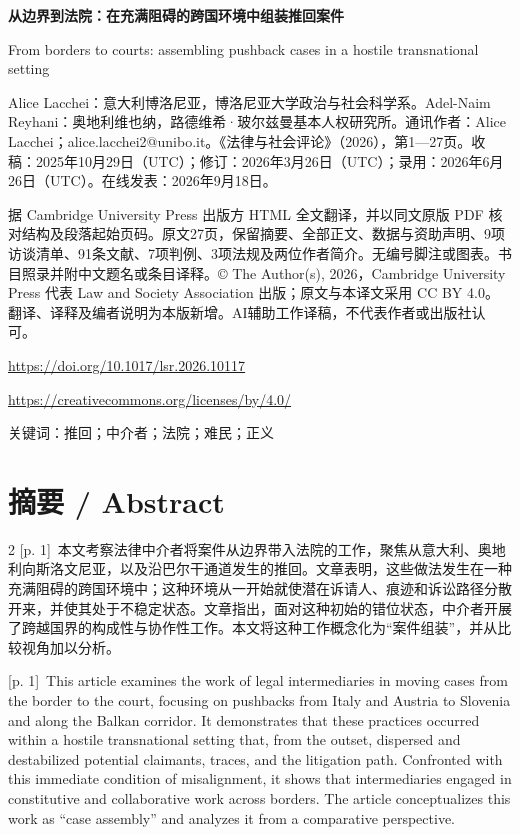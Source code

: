 \documentclass[10pt,a4paper]{article}
\begin{document}
{\Large\bfseries 从边界到法院：在充满阻碍的跨国环境中组装推回案件\par}\medskip
From borders to courts: assembling pushback cases in a hostile transnational setting\par
Alice Lacchei：意大利博洛尼亚，博洛尼亚大学政治与社会科学系。Adel-Naim Reyhani：奥地利维也纳，路德维希·玻尔兹曼基本人权研究所。通讯作者：Alice Lacchei；alice.lacchei2@unibo.it。《法律与社会评论》（2026），第1—27页。收稿：2025年10月29日（UTC）；修订：2026年3月26日（UTC）；录用：2026年6月26日（UTC）。在线发表：2026年9月18日。\par
据 Cambridge University Press 出版方 HTML 全文翻译，并以同文原版 PDF 核对结构及段落起始页码。原文27页，保留摘要、全部正文、数据与资助声明、9项访谈清单、91条文献、7项判例、3项法规及两位作者简介。无编号脚注或图表。书目照录并附中文题名或条目译释。© The Author(s), 2026，Cambridge University Press 代表 Law and Society Association 出版；原文与本译文采用 CC BY 4.0。翻译、译释及编者说明为本版新增。AI辅助工作译稿，不代表作者或出版社认可。\par
\url{https://doi.org/10.1017/lsr.2026.10117}\par
\url{https://creativecommons.org/licenses/by/4.0/}\par
关键词：推回；中介者；法院；难民；正义\par\bigskip
{}\section*{摘要 / Abstract}
\begin{paracol}{2}
{\scriptsize\color{gray} [p. 1]}\ 本文考察法律中介者将案件从边界带入法院的工作，聚焦从意大利、奥地利向斯洛文尼亚，以及沿巴尔干通道发生的推回。文章表明，这些做法发生在一种充满阻碍的跨国环境中；这种环境从一开始就使潜在诉请人、痕迹和诉讼路径分散开来，并使其处于不稳定状态。文章指出，面对这种初始的错位状态，中介者开展了跨越国界的构成性与协作性工作。本文将这种工作概念化为“案件组装”，并从比较视角加以分析。\par
\switchcolumn
{\scriptsize\color{gray} [p. 1]}\ This article examines the work of legal intermediaries in moving cases from the border to the court, focusing on pushbacks from Italy and Austria to Slovenia and along the Balkan corridor. It demonstrates that these practices occurred within a hostile transnational setting that, from the outset, dispersed and destabilized potential claimants, traces, and the litigation path. Confronted with this immediate condition of misalignment, it shows that intermediaries engaged in constitutive and collaborative work across borders. The article conceptualizes this work as “case assembly” and analyzes it from a comparative perspective.\par
\switchcolumn*
\end{paracol}
\end{document}

